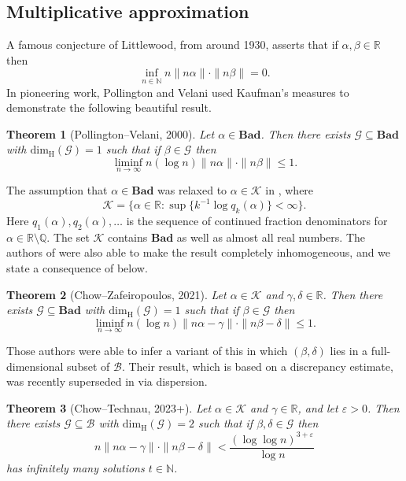 \documentclass[12pt, reqno]{amsart}
\newtheorem{thm}{Theorem}[section]
\theoremstyle{definition}
\theoremstyle{remark}
\numberwithin{equation}{section}
\def\alp{{\alpha}} \def\bfalp{{\boldsymbol \alpha}}
\def\bet{{\beta}}  \def\bfbet{{\boldsymbol \beta}}
\def\gam{{\gamma}} \def\Gam{{\Gamma}}
\def\del{{\delta}} \def\Del{{\Delta}}
\def\eps{\varepsilon}
\def\le{\leqslant} \def\ge{\geqslant}
\def \bN {\mathbb N}
\def \bQ {\mathbb Q}
\def \bR {\mathbb R}
\def \cB {\mathcal B}
\def \cG {\mathcal G}
\def \cK {\mathcal K}
\def \dim {\mathrm{dim}}
\def \Bad {{\mathrm{\mathbf{Bad}}}}
\def \dimH {\dim_{\mathrm{H}}}
\begin{document}
	\subsection{Multiplicative approximation}
	
	A famous conjecture of Littlewood, from around 1930, asserts that if $\alp, \bet \in \bR$ then
	\[
	\inf_{n \in \bN}
	n \| n \alp \| \cdot \| n \bet \|
	= 0.
	\]
	In pioneering work, Pollington and Velani \cite{PV2000} used Kaufman's measures to demonstrate the following beautiful result.
	
	\begin{thm} 
		[Pollington--Velani, 2000]
		Let $\alp \in \Bad$. Then there exists $\cG \subseteq \Bad$ with $\dimH(\cG) = 1$ such that if $\bet \in \cG$ then
		\[
		\liminf_{n \to \infty} n(\log n)
		\| n \alp \| \cdot \| n \bet \| 
		\le 1.
		\]
	\end{thm}
	
	The assumption that $\alp \in \Bad$ was relaxed to $\alp \in \cK$ in \cite{CZ2021}, where
	\begin{equation} \label{Kdef}
		\cK = \{ \alp \in \bR:
		\sup \{ k^{-1} \log q_k(\alp) \}
		< \infty \}.
	\end{equation}
	Here $q_1(\alp), q_2(\alp), \ldots$ is the sequence of continued fraction denominators for $\alp \in \bR \setminus \bQ$. The set $\cK$ contains $\Bad$ as well as almost all real numbers. The authors of \cite{CZ2021} were also able to make the result completely inhomogeneous, and we state a consequence of \cite[Theorem 1.1]{CZ2021} below.
	
	\begin{thm} 
		[Chow--Zafeiropoulos, 2021]
		Let $\alp \in \cK$ and
		$\gam, \del \in \bR$. Then there exists $\cG \subseteq \Bad$ with
		$\dimH(\cG) = 1$ such that if 
		$\bet \in \cG$ then
		\begin{equation}
			\label{LogThreshold}
			\liminf_{n \to \infty}
			n (\log n) \| n \alp - \gam \|
			\cdot \| n \bet - \del \| \le 1.
		\end{equation}
	\end{thm}
	
	Those authors were able to infer a variant of this in which 
	$(\bet, \del)$ lies in a full-dimensional subset of $\cB$. Their result, which is based on a discrepancy estimate, was recently superseded in 
	\cite[Corollary 1.6]{CT} via
	dispersion.
	
	\begin{thm} [Chow--Technau, 2023+]
		\label{CTlift}
		Let $\alp \in \cK$ and $\gam \in \bR$, and let $\eps > 0$. Then there exists $\cG \subseteq \cB$ with $\dimH(\cG) = 2$ such that if $\bet, \del \in \cG$ then
		\[
		n \| n \alp - \gam \| \cdot
		\| n \bet - \del \| <
		\frac{(\log \log n)^{3+\eps}}
		{\log n}
		\]
		has infinitely many solutions
		$t \in \bN$.
	\end{thm}
	
\end{document}
